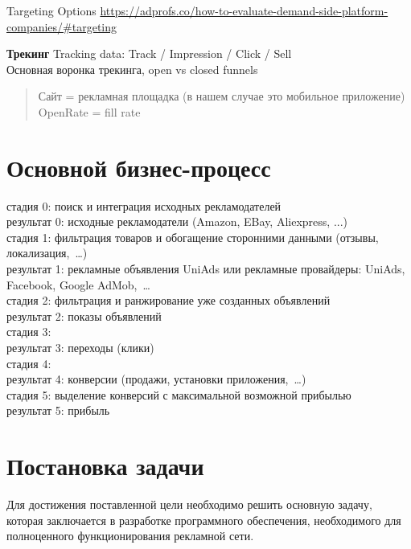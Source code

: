 \documentclass[times]{itmo-student-thesis}
\begin{document}
Targeting Options \url{https://adprofs.co/how-to-evaluate-demand-side-platform-companies/#targeting}


\textbf{Трекинг}
Tracking data: Track / Impression / Click / Sell
\\
Основная воронка трекинга, open vs closed funnels


\begin{quotation}
  Сайт = рекламная площадка (в нашем случае это мобильное приложение)
  \\
  OpenRate = fill rate

\end{quotation}


\section{Основной бизнес-процесс}

стадия 0: поиск и интеграция исходных рекламодателей
\\
результат 0: исходные рекламодатели (Amazon, EBay, Aliexpress, ...)
\\
стадия 1: фильтрация товаров и обогащение сторонними данными (отзывы, локализация, …)
\\
результат 1: рекламные объявления UniAds или рекламные провайдеры: UniAds, Facebook, Google AdMob, …
\\
стадия 2: фильтрация и ранжирование уже созданных объявлений
\\
результат 2: показы объявлений
\\
стадия 3:
\\
результат 3: переходы (клики)
\\
стадия 4:
\\
результат 4: конверсии (продажи, установки приложения, …)
\\
стадия 5: выделение конверсий с максимальной возможной прибылью
\\
результат 5: прибыль
\\	

\section{Постановка задачи}


Для достижения поставленной цели необходимо решить основную задачу, которая заключается в разработке программного обеспечения, необходимого для полноценного функционирования рекламной сети.
\end{document}
